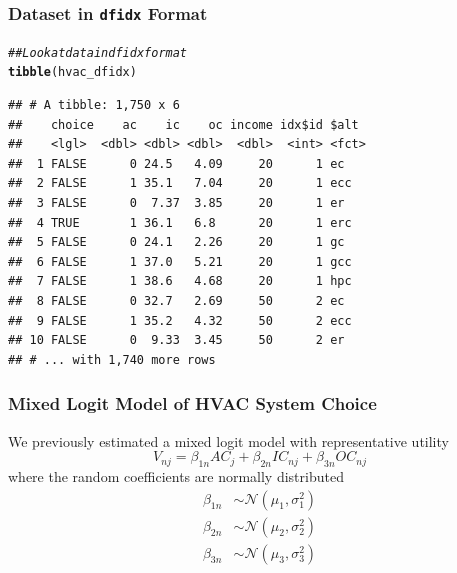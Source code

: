 \documentclass{beamer}\usepackage[]{graphicx}\usepackage[]{xcolor}
\makeatletter
\newcommand{\hlcom}[1]{\textcolor[rgb]{0.678,0.584,0.686}{\textit{#1}}}%
\newcommand{\hlstd}[1]{\textcolor[rgb]{0.345,0.345,0.345}{#1}}%
\newcommand{\hlkwd}[1]{\textcolor[rgb]{0.737,0.353,0.396}{\textbf{#1}}}%
\newenvironment{kframe}{%
 \def\at@end@of@kframe{}%
 \ifinner\ifhmode%
  \def\at@end@of@kframe{\end{minipage}}%
  \begin{minipage}{\columnwidth}%
 \fi\fi%
 \def\FrameCommand##1{\hskip\@totalleftmargin \hskip-\fboxsep
 \colorbox{shadecolor}{##1}\hskip-\fboxsep
     \hskip-\linewidth \hskip-\@totalleftmargin \hskip\columnwidth}%
 \MakeFramed {\advance\hsize-\width
   \@totalleftmargin\z@ \linewidth\hsize
   \@setminipage}}%
 {\par\unskip\endMakeFramed%
 \at@end@of@kframe}
\newenvironment{knitrout}{}{} %
\makeatother
\begin{document}
\begin{frame}[fragile]\frametitle{Dataset in \texttt{dfidx} Format}
\begin{knitrout}\footnotesize
{}\color{fgcolor}\begin{kframe}
\begin{alltt}
\hlcom{## Look at data in dfidx format}
\hlkwd{tibble}\hlstd{(hvac_dfidx)}
\end{alltt}
\begin{verbatim}
## # A tibble: 1,750 x 6
##    choice    ac    ic    oc income idx$id $alt 
##    <lgl>  <dbl> <dbl> <dbl>  <dbl>  <int> <fct>
##  1 FALSE      0 24.5   4.09     20      1 ec   
##  2 FALSE      1 35.1   7.04     20      1 ecc  
##  3 FALSE      0  7.37  3.85     20      1 er   
##  4 TRUE       1 36.1   6.8      20      1 erc  
##  5 FALSE      0 24.1   2.26     20      1 gc   
##  6 FALSE      1 37.0   5.21     20      1 gcc  
##  7 FALSE      1 38.6   4.68     20      1 hpc  
##  8 FALSE      0 32.7   2.69     50      2 ec   
##  9 FALSE      1 35.2   4.32     50      2 ecc  
## 10 FALSE      0  9.33  3.45     50      2 er   
## # ... with 1,740 more rows
\end{verbatim}
\end{kframe}
\end{knitrout}
\end{frame}

\begin{frame}\frametitle{Mixed Logit Model of HVAC System Choice}
    We previously estimated a mixed logit model with representative utility
    $$V_{nj} = \beta_{1n} AC_j + \beta_{2n} IC_{nj} + \beta_{3n} OC_{nj}$$
    where the random coefficients are normally distributed
    \begin{align*}
        \beta_{1n} & \sim \mathcal{N}(\mu_1, \sigma_1^2) \\
        \beta_{2n} & \sim \mathcal{N}(\mu_2, \sigma_2^2) \\
        \beta_{3n} & \sim \mathcal{N}(\mu_3, \sigma_3^2)
    \end{align*}
\end{frame}
\end{document}
